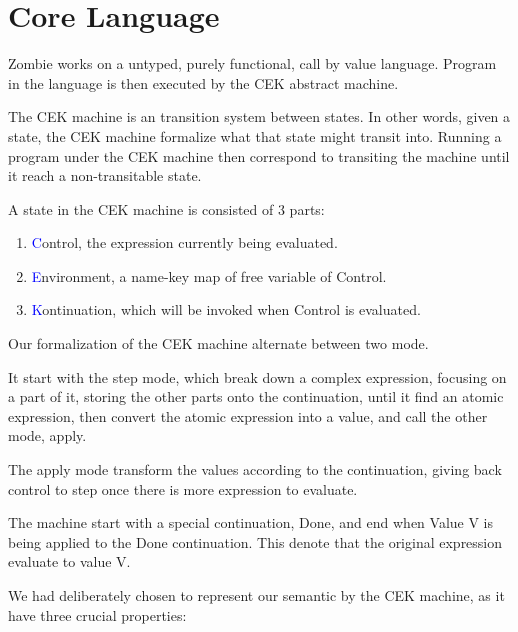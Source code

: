 \section{Core Language}	
Zombie works on a untyped, purely functional, call by value language. Program in the language is then executed by the CEK abstract machine.

The CEK machine is an transition system between states. In other words, given a state, the CEK machine formalize what that state might transit into. Running a program under the CEK machine then correspond to transiting the machine until it reach a non-transitable state.

A state in the CEK machine is consisted of 3 parts:

\begin{enumerate}
	\item \textcolor{blue}{C}ontrol, the expression currently being evaluated.
	\item \textcolor{blue}{E}nvironment, a name-key map of free variable of Control.
	\item \textcolor{blue}{K}ontinuation, which will be invoked when Control is evaluated.
\end{enumerate}

Our formalization of the CEK machine alternate between two mode.

It start with the step mode, which break down a complex expression, focusing on a part of it, storing the other parts onto the continuation, until it find an atomic expression, then convert the atomic expression into a value, and call the other mode, apply.

The apply mode transform the values according to the continuation, giving back control to step once there is more expression to evaluate.

The machine start with a special continuation, Done, and end when Value V is being applied to the Done continuation. This denote that the original expression evaluate to value V.

We had deliberately chosen to represent our semantic by the CEK machine, as it have three crucial properties:

